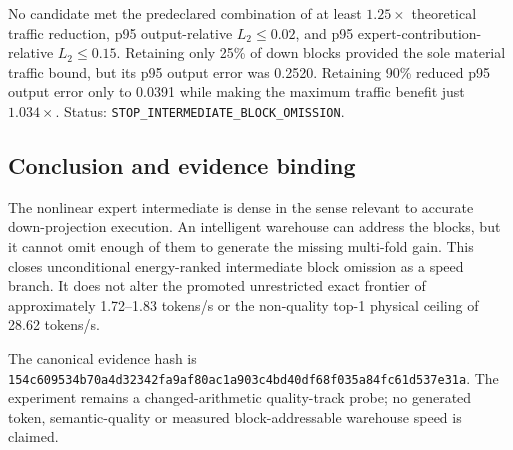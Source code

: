 No candidate met the predeclared combination of at least $1.25\times$
theoretical traffic reduction, p95 output-relative $L_2\leq0.02$, and p95
expert-contribution-relative $L_2\leq0.15$.  Retaining only 25\% of down blocks
provided the sole material traffic bound, but its p95 output error was 0.2520.
Retaining 90\% reduced p95 output error only to 0.0391 while making the maximum
traffic benefit just $1.034\times$.  Status:
\texttt{STOP\_INTERMEDIATE\_BLOCK\_OMISSION}.

\subsection{Conclusion and evidence binding}

The nonlinear expert intermediate is dense in the sense relevant to accurate
down-projection execution.  An intelligent warehouse can address the blocks,
but it cannot omit enough of them to generate the missing multi-fold gain.
This closes unconditional energy-ranked intermediate block omission as a speed
branch.  It does not alter the promoted unrestricted exact frontier of
approximately 1.72--1.83 tokens/s or the non-quality top-1 physical ceiling of
28.62 tokens/s.

The canonical evidence hash is
\texttt{154c609534b70a4d32342fa9af80ac1a903c4bd40df68f035a84fc61d537e31a}.
The experiment remains a changed-arithmetic quality-track probe; no generated
token, semantic-quality or measured block-addressable warehouse speed is
claimed.
